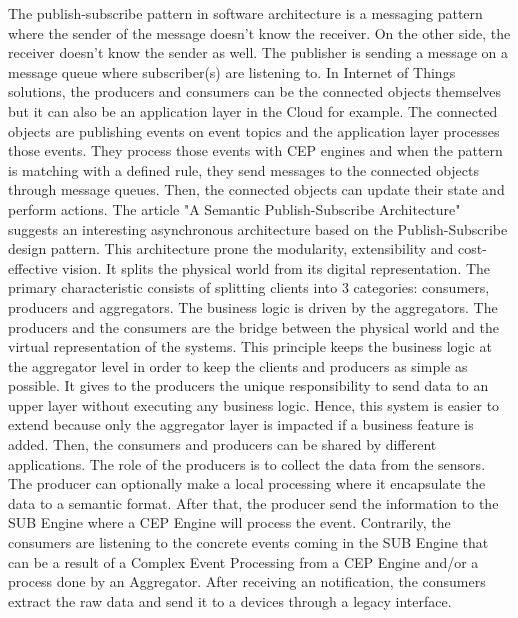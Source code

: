 \documentclass[11pt]{article}
\begin{document}
The publish-subscribe pattern in software architecture is a messaging pattern where the sender of the message doesn't know the receiver. On the other side, the receiver doesn't know the sender as well. The publisher is sending a message on a message queue where subscriber(s) are listening to. In Internet of Things solutions, the producers and consumers can be the connected objects themselves but it can also be an application layer in the Cloud for example. The connected objects are publishing events on event topics and the application layer processes those events. They process those events with CEP engines and when the pattern is matching with a defined rule, they send messages to the connected objects through message queues. Then, the connected objects can update their state and perform actions.
\newline
\newline
The article "A Semantic Publish-Subscribe Architecture" \cite{A Semantic Publish-Subscribe Architecture} suggests an interesting asynchronous architecture based on the Publish-Subscribe design pattern. This architecture prone the modularity, extensibility and cost-effective vision. It splits the physical world from its digital representation. The primary characteristic consists of splitting clients into 3 categories: consumers, producers and aggregators. The business logic is driven by the aggregators. The producers and the consumers are the bridge between the physical world and the virtual representation of the systems. This principle keeps the business logic at the aggregator level in order to keep the clients and producers as simple as possible. It gives to the producers the unique responsibility to send data to an upper layer without executing any business logic. Hence, this system is easier to extend because only the aggregator layer is impacted if a business feature is added. Then, the consumers and producers can be shared by different applications.
\newline
\newline
The role of the producers is to collect the data from the sensors. The producer can optionally make a local processing where it encapsulate the data to a semantic format. After that, the producer send the information to the SUB Engine where a CEP Engine will process the event.
Contrarily, the consumers are listening to the concrete events coming in the SUB Engine that can be a result of a Complex Event Processing from a CEP Engine and/or a process done by an Aggregator. After receiving an notification, the consumers extract the raw data and send it to a devices through a legacy interface.
\end{document}
